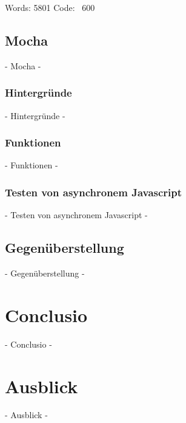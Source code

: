 Words: 5801
Code: ~600

\subsection{Mocha}
 - Mocha -

\subsubsection{Hintergründe}
 - Hintergründe -
\subsubsection{Funktionen}
 - Funktionen -
\subsubsection{Testen von asynchronem Javascript}
 - Testen von asynchronem Javascript -

\subsection{Gegenüberstellung}
 - Gegenüberstellung -
\newpage
\section{Conclusio}
 - Conclusio -

\newpage
\section{Ausblick}
 - Ausblick -

\nocite{Green:2013}
\nocite{Kozlowski:2013}
\nocite{Zakas:2012}
\nocite{MacCaw:2011}
\nocite{Burnham:2011}
\nocite{Gaertner:2012}
